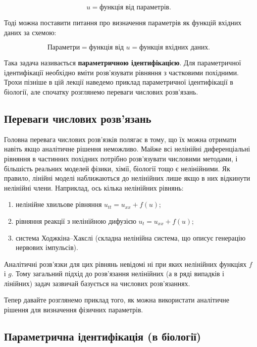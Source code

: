 \documentclass[
  ukrainian,
]{article}
\providecommand{\tightlist}{%
  \setlength{\itemsep}{0pt}\setlength{\parskip}{0pt}}
\begin{document}
\[u = \text{функція від параметрів}.\]

Тоді можна поставити питання про визначення параметрів як функцій
вхідних даних за схемою:

\[\text{Параметри} = \text{функція від } u = \text{функція вхідних даних}.\]

Така задача називається \textbf{параметричною ідентифікацією}. Для
параметричної ідентифікації необхідно вміти розв'язувати рівняння з
частковими похідними. Трохи пізніше в цій лекції наведемо приклад
параметричної ідентифікації в біології, але спочатку розглянемо переваги
числових розв'язань.

\subsection{Переваги числових
розв'язань}\label{ux43fux435ux440ux435ux432ux430ux433ux438-ux447ux438ux441ux43bux43eux432ux438ux445-ux440ux43eux437ux432ux44fux437ux430ux43dux44c}

Головна перевага числових розв'язків полягає в тому, що їх можна
отримати навіть якщо аналітичне рішення неможливо. Майже всі нелінійні
диференціальні рівняння в частинних похідних потрібно розв'язувати
числовими методами, і більшість реальних моделей фізики, хімії, біології
тощо є нелінійними. Як правило, лінійні моделі наближаються до
нелінійних лише якщо в них відкинути нелінійні члени. Наприклад, ось
кілька нелінійних рівнянь:

\begin{enumerate}
\def\labelenumi{\arabic{enumi}.}
\tightlist
\item
  нелінійне хвильове рівняння \(u_{tt} = u_{xx} + f(u)\);
\item
  рівняння реакції з нелінійною дифузією \(u_t = u_{xx} + f(u)\);
\item
  система Ходжкіна--Хакслі (складна нелінійна система, що описує
  генерацію нервових імпульсів).
\end{enumerate}

Аналітичні розв'язки для цих рівнянь невідомі ні при яких нелінійних
функціях \(f\) і \(g\). Тому загальний підхід до розв'язання нелінійних
(а в ряді випадків і лінійних) задач зазвичай базується на числових
розв'язаннях.

Тепер давайте розглянемо приклад того, як можна використати аналітичне
рішення для визначення фізичних параметрів.

\subsection{Параметрична ідентифікація (в
біології)}\label{ux43fux430ux440ux430ux43cux435ux442ux440ux438ux447ux43dux430-ux456ux434ux435ux43dux442ux438ux444ux456ux43aux430ux446ux456ux44f-ux432-ux431ux456ux43eux43bux43eux433ux456ux457}
\end{document}
